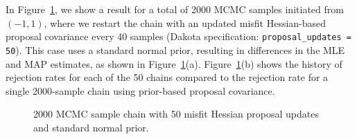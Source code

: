 In Figure~\ref{fig:rosen_restart}, we show a result for a total of
2000 MCMC samples initiated from $(-1,1)$, where we restart the chain
with an updated misfit Hessian-based proposal covariance every 40
samples (Dakota specification: \texttt{proposal\_updates = 50}).  This
case uses a standard normal prior, resulting in differences in the MLE
and MAP estimates, as shown in Figure~\ref{fig:rosen_restart}(a).
Figure~\ref{fig:rosen_restart}(b) shows the history of rejection rates
for each of the 50 chains compared to the rejection rate for a single
2000-sample chain using prior-based proposal covariance.
\begin{figure}[htbp]
  \begin{subfigmatrix}{2}
  \end{subfigmatrix}
  \caption{2000 MCMC sample chain with 50 misfit Hessian proposal
    updates and standard normal prior.}
\label{fig:rosen_restart}
\end{figure}
